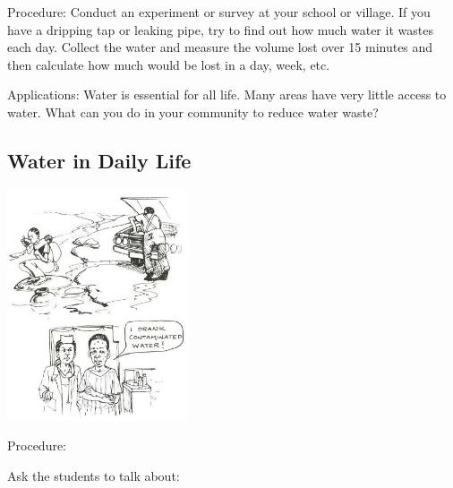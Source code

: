 \begin{multicols}{2}
\begin{description*}
\item[Procedure:]{Conduct an experiment or survey at your school or village. If you have a dripping tap or leaking pipe, try to find out how much water it wastes each day. Collect the water and measure the volume lost over 15 minutes and then calculate how much would be lost in a day, week, etc.}
\item[Applications:]{Water is essential for all life. Many areas have very little access to water. What can you do in your community to reduce water waste?}
\end{description*}

\columnbreak

\subsection{Water in Daily Life}

\begin{center}
\includegraphics[width=0.4\textwidth]{./img/source/water-daily-life.jpg}
\end{center}

\begin{description*}
\item[Procedure:]{Ask the students to
talk about:

}
\end{description*}
\end{multicols}
